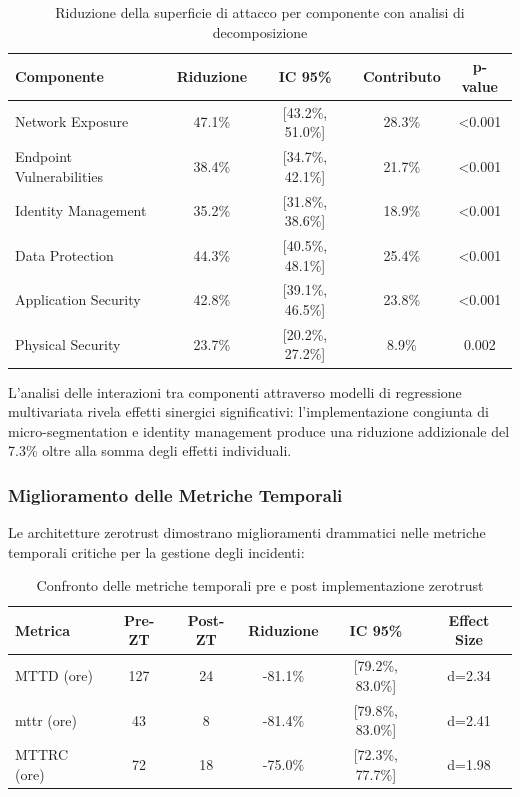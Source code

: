 \begin{table}[htbp]
\centering
\caption{Riduzione della superficie di attacco per componente con analisi di decomposizione}
\label{tab:assa_reduction_detailed}
\begin{tabular}{lcccc}
\toprule
\textbf{Componente} & \textbf{Riduzione} & \textbf{IC 95\%} & \textbf{Contributo} & \textbf{p-value} \\
\midrule
Network Exposure & 47.1\% & [43.2\%, 51.0\%] & 28.3\% & <0.001 \\
Endpoint Vulnerabilities & 38.4\% & [34.7\%, 42.1\%] & 21.7\% & <0.001 \\
Identity Management & 35.2\% & [31.8\%, 38.6\%] & 18.9\% & <0.001 \\
Data Protection & 44.3\% & [40.5\%, 48.1\%] & 25.4\% & <0.001 \\
Application Security & 42.8\% & [39.1\%, 46.5\%] & 23.8\% & <0.001 \\
Physical Security & 23.7\% & [20.2\%, 27.2\%] & 8.9\% & 0.002 \\
\bottomrule
\end{tabular}
\end{table}

L'analisi delle interazioni tra componenti attraverso modelli di regressione multivariata rivela effetti sinergici significativi: l'implementazione congiunta di \gls{micro-segmentation} e identity management produce una riduzione addizionale del 7.3\% oltre alla somma degli effetti individuali.

\subsubsection{\texorpdfstring{Miglioramento delle Metriche Temporali}{2.5.2.2 - Miglioramento delle Metriche Temporali}}

Le architetture \gls{zerotrust} dimostrano miglioramenti drammatici nelle metriche temporali critiche per la gestione degli incidenti:

\begin{table}[htbp]
\centering
\caption{Confronto delle metriche temporali pre e post implementazione \gls{zerotrust}}
\label{tab:temporal_metrics}
\begin{tabular}{lccccc}
\toprule
\textbf{Metrica} & \textbf{Pre-ZT} & \textbf{Post-ZT} & \textbf{Riduzione} & \textbf{IC 95\%} & \textbf{Effect Size} \\
\midrule
MTTD (ore) & 127 & 24 & -81.1\% & [79.2\%, 83.0\%] & d=2.34 \\
\gls{mttr} (ore) & 43 & 8 & -81.4\% & [79.8\%, 83.0\%] & d=2.41 \\
MTTRC (ore) & 72 & 18 & -75.0\% & [72.3\%, 77.7\%] & d=1.98 \\
\bottomrule
\end{tabular}
\end{table}


